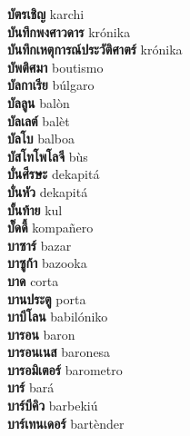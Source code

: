 \textbf{ บัตรเชิญ  } karchi \\
\textbf{ บันทึกพงศาวดาร  } krónika \\
\textbf{ บันทึกเหตุการณ์ประวัติศาตร์  } krónika \\
\textbf{ บัพติศมา  } boutismo \\
\textbf{ บัลกาเรีย  } búlgaro \\
\textbf{ บัลลูน  } balòn \\
\textbf{ บัลเลต์  } balèt \\
\textbf{ บัลโบ  } balboa \\
\textbf{ บัสโทโพโลจี  } bùs \\
\textbf{ บั่นศีรษะ  } dekapitá \\
\textbf{ บั่นหัว  } dekapitá \\
\textbf{ บั้นท้าย  } kul \\
\textbf{ บั๊ดดี้  } kompañero \\
\textbf{ บาซาร์  } bazar \\
\textbf{ บาซูก้า  } bazooka \\
\textbf{ บาด  } corta \\
\textbf{ บานประตู  } porta \\
\textbf{ บาบีโลน  } babilóniko \\
\textbf{ บารอน  } baron \\
\textbf{ บารอนเนส  } baronesa \\
\textbf{ บารอมิเตอร์  } barometro \\
\textbf{ บาร์  } bará \\
\textbf{ บาร์บีคิว  } barbekiú \\
\textbf{ บาร์เทนเดอร์  } bartènder \\
